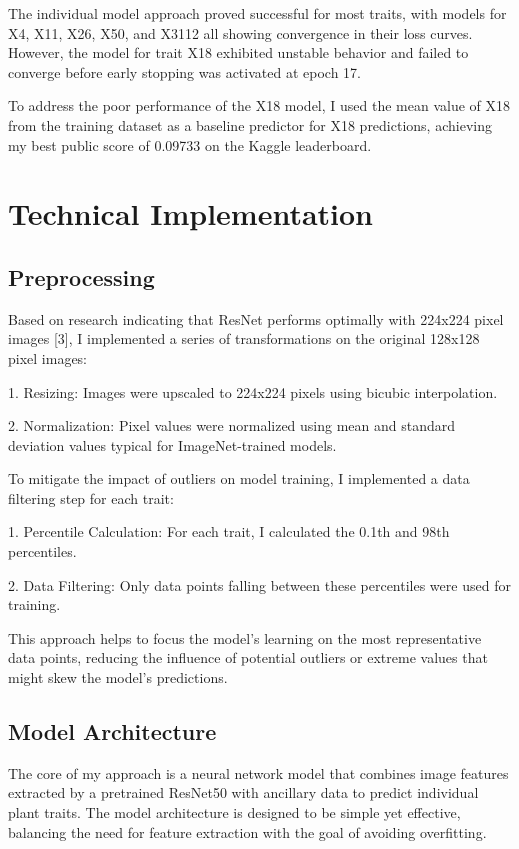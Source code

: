 \documentclass{article}
\begin{document}
The individual model approach proved successful for most traits, with models for X4, X11, X26, X50, and X3112 all showing convergence in their loss curves. However, the model for trait X18 exhibited unstable behavior and failed to converge before early stopping was activated at epoch 17.

To address the poor performance of the X18 model, I used the mean value of X18 from the training dataset as a baseline predictor for X18 predictions, achieving my best public score of 0.09733 on the Kaggle leaderboard.

\section{Technical Implementation}

\subsection{Preprocessing}

Based on research indicating that ResNet performs optimally with 224x224 pixel images [3], I implemented a series of transformations on the original 128x128 pixel images:

1. Resizing: Images were upscaled to 224x224 pixels using bicubic interpolation.

2. Normalization: Pixel values were normalized using mean and standard deviation values typical for ImageNet-trained models.

To mitigate the impact of outliers on model training, I implemented a data filtering step for each trait:

1. Percentile Calculation: For each trait, I calculated the 0.1th and 98th percentiles.

2. Data Filtering: Only data points falling between these percentiles were used for training.

This approach helps to focus the model's learning on the most representative data points, reducing the influence of potential outliers or extreme values that might skew the model's predictions.

\subsection{Model Architecture}

The core of my approach is a neural network model that combines image features extracted by a pretrained ResNet50 with ancillary data to predict individual plant traits. The model architecture is designed to be simple yet effective, balancing the need for feature extraction with the goal of avoiding overfitting. 
\end{document}
